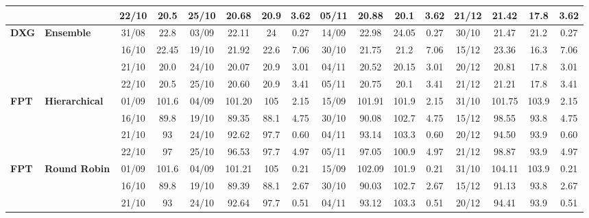 \documentclass{ieeeaccess}
\begin{document}
\begin{table}[!h]
\begin{tabular}{llcc|cccc|cccc|cccc}
&
& 22/10 & 20.5 & 25/10 & 20.68 & 20.9 & 3.62 & 05/11 & 20.88 & 20.1 & 3.62 & 21/12 & 21.42 & 17.8 & 3.62 \\
\midrule


\multirow{4}{*}{\textbf{DXG}} 
& \textbf{Ensemble}
& 31/08 & 22.8 & 03/09 & 22.11 & 24 & 0.27 & 14/09 & 22.98 & 24.05 & 0.27 & 30/10 & 21.47 & 21.2 & 0.27 \\

&
& 16/10 & 22.45 & 19/10 & 21.92 & 22.6 & 7.06 & 30/10 & 21.75 & 21.2 & 7.06 & 15/12 & 23.36 & 16.3 & 7.06 \\

&
& 21/10 & 20.0 & 24/10 & 20.07 & 20.9 & 3.01 & 04/11 & 20.52 & 20.15 & 3.01 & 20/12 & 20.81 & 17.8 & 3.01 \\

&
& 22/10 & 20.5 & 25/10 & 20.60 & 20.9 & 3.41 & 05/11 & 20.75 & 20.1 & 3.41 & 21/12 & 21.21 & 17.8 & 3.41 \\
\midrule



\multirow{4}{*}{\textbf{FPT}} 
& \textbf{Hierarchical}
& 01/09 & 101.6 & 04/09 & 101.20 & 105 & 2.15 & 15/09 & 101.91 & 101.9 & 2.15 & 31/10 & 101.75 & 103.9 & 2.15 \\
&
& 16/10 & 89.8 & 19/10 & 89.35 & 88.1 & 4.75 & 30/10 & 90.08 & 102.7 & 4.75 & 15/12 & 98.55 & 93.8 & 4.75 \\

&
& 21/10 & 93 & 24/10 & 92.62 & 97.7 & 0.60 & 04/11 & 93.14 & 103.3 & 0.60 & 20/12 & 94.50 & 93.9 &0.60\\

&
& 22/10 & 97 & 25/10 & 96.53 & 97.7 & 4.97 & 05/11 & 97.05 & 100.9 & 4.97 & 21/12 & 98.87 & 93.9 & 4.97 \\
\midrule


\multirow{4}{*}{\textbf{FPT}} 
& \textbf{Round Robin}
& 01/09 & 101.6 & 04/09 & 101.21 & 105 & 0.21 & 15/09 & 102.09 & 101.9 & 0.21 & 31/10 & 104.11 & 103.9 & 0.21 \\

&
& 16/10 & 89.8 & 19/10 & 89.39 & 88.1 & 2.67 & 30/10 & 90.03 & 102.7 & 2.67 & 15/12 & 91.13 & 93.8 & 2.67 \\

&
& 21/10 & 93 & 24/10 & 92.64 & 97.7 & 0.51 & 04/11 & 93.12 & 103.3 & 0.51 & 20/12 & 94.41 & 93.9 & 0.51 \\


\end{tabular}
\end{table}
\end{document}
